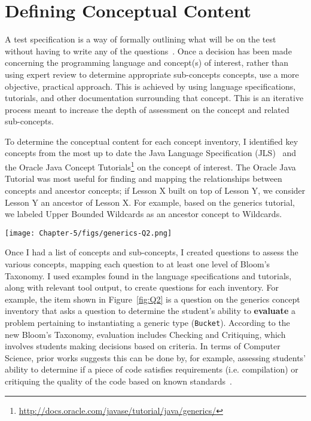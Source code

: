 \section{Defining Conceptual Content}

A test specification is a way of formally outlining what will be on the test without having to write any of the questions~\cite{tew2010developing}. Once a decision has been made concerning the programming language and concept(s) of interest, rather than using expert review to determine appropriate sub-concepts concepts, use a more objective, practical approach. This is achieved by using language specifications, tutorials, and other documentation surrounding that concept. This is an iterative process meant to increase the depth of assessment on the concept and related sub-concepts.

To determine the conceptual content for each concept inventory, I identified key concepts from the most up to date the Java Language Specification (JLS)~\cite{Gosling:1996:JLS:560667} and the Oracle Java Concept Tutorials\footnote{\url{http://docs.oracle.com/javase/tutorial/java/generics/}} on the concept of interest. The Oracle Java Tutorial was most useful for finding and mapping the relationships between concepts and ancestor concepts; if Lesson X built on top of Lesson Y, we consider Lesson Y an ancestor of Lesson X. For example, based on the generics tutorial, we labeled Upper Bounded Wildcards as an ancestor concept to Wildcards. 

	\begin{figure*}[ht]
		\centering
		\texttt{[image: Chapter-5/figs/generics-Q2.png]}
		\caption{Question assessing ability to evaluate generic type instantiation.\label{fig:Q2}}
	\end{figure*}	
	
Once I had a list of concepts and sub-concepts, I created questions to assess the various concepts, mapping each question to at least one level of Bloom's Taxonomy. I used examples found in the language specifications and tutorials, along with relevant tool output, to create questions for each inventory. For example, the item shown in Figure~\ref{fig:Q2} is a question on the generics concept inventory that asks a question to determine the student's ability to \textbf{evaluate} a problem pertaining to instantiating a generic type (\texttt{Bucket}). According to the new Bloom's Taxonomy, evaluation includes Checking and Critiquing, which involves students making decisions based on criteria. In terms of Computer Science, prior works suggests this can be done by, for example, assessing students' ability to determine if a piece of code satisfies requirements (i.e. compilation) or critiquing the quality of the code based on known standards~\cite{thompson2008bloom}.

